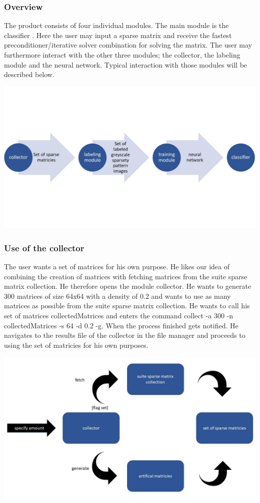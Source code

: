 \documentclass[parskip=full]{scrartcl}
\begin{document}
\subsubsection{Overview}
The product consists of four individual modules. The main module is the \gls{classifier} . Here the user may input a sparse matrix and receive the fastest \gls{preconditioner}/\gls{iterative solver} combination for solving the matrix. The user may furthermore interact with the other three modules; the \gls{collector}, the \gls{labeling module} and the \gls{neural network}.  Typical interaction with those modules will be described below.
\begin{center}
\includegraphics[width=\textwidth]{workflow}
\end{center}


\subsubsection{Use of the \gls{collector}}
The user wants a set of matrices for his own purpose. He likes our idea of combining the creation of matrices with fetching matrices from the suite sparse matrix collection. He therefore opens the module \gls{collector}. He wants to generate 300 matrices of size 64x64 with a density of 0.2 and wants to use as many matrices as possible from the suite sparse matrix collection. He wants to call his set of matrices collectedMatrices and enters the command collect -a 300 -n collectedMatrices -s 64 -d 0.2 -g. When the process finished gets notified. He navigates to the results file of the \gls{collector} in the file manager and proceeds to using the set of matricies for his own purposes.
\begin{center}
\includegraphics[width=\textwidth]{collector}
\end{center}
\end{document}
